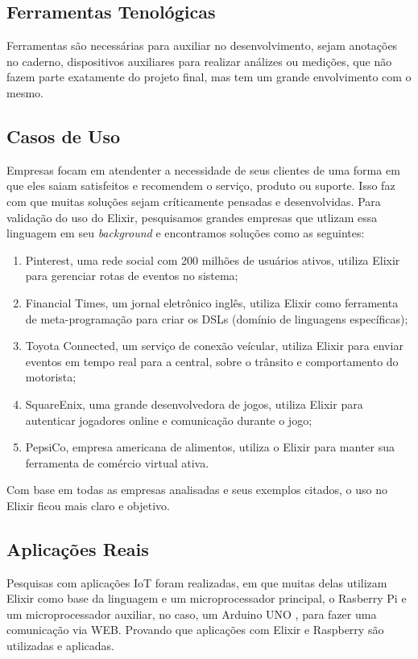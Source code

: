 \documentclass[../../layout.tex]{subfiles}
\begin{document}
\subsection{Ferramentas Tenológicas}
\hspace*{3em}Ferramentas são necessárias para auxiliar no desenvolvimento, sejam anotações no caderno, dispositivos auxiliares para realizar análizes ou medições, que não fazem parte exatamente do projeto final, mas tem um grande envolvimento com o mesmo.
\subsection{Casos de Uso}
\hspace*{3em}Empresas focam em atendenter a necessidade de seus clientes de uma forma em que eles saiam satisfeitos e recomendem o serviço, produto ou suporte. Isso faz com que muitas soluções sejam críticamente pensadas e desenvolvidas. Para validação do uso do Elixir, pesquisamos grandes empresas que utlizam essa linguagem em seu \emph{background}  e encontramos soluções como as seguintes:
\begin{enumerate}[label=\alph*)]
\itemsep0em
    \item Pinterest, uma rede social com 200 milhões de usuários ativos, utiliza Elixir para gerenciar rotas de eventos no sistema;
    \item Financial Times, um jornal eletrônico inglês, utiliza Elixir como ferramenta de meta-programação para criar os DSLs (domínio de linguagens específicas);
    \item Toyota Connected, um serviço de conexão veícular, utiliza Elixir para enviar eventos em tempo real para a central, sobre o trânsito e comportamento do motorista;
    \item SquareEnix, uma grande desenvolvedora de jogos, utiliza Elixir para autenticar jogadores online e comunicação durante o  jogo;
    \item PepsiCo, empresa americana de alimentos, utiliza o Elixir para manter sua ferramenta de comércio virtual ativa.
\end{enumerate}

Com base em todas as empresas analisadas e seus exemplos citados, o uso no Elixir ficou mais claro e objetivo. \par

\subsection{Aplicações Reais}
\hspace*{3em}Pesquisas com aplicações IoT foram realizadas, em que muitas delas utilizam Elixir como base da linguagem e um microprocessador principal, o Rasberry Pi e um microprocessador auxiliar, no caso, um Arduino UNO , para fazer uma comunicação via WEB. Provando que aplicações com Elixir e Raspberry são utilizadas e aplicadas.
\end{document}
